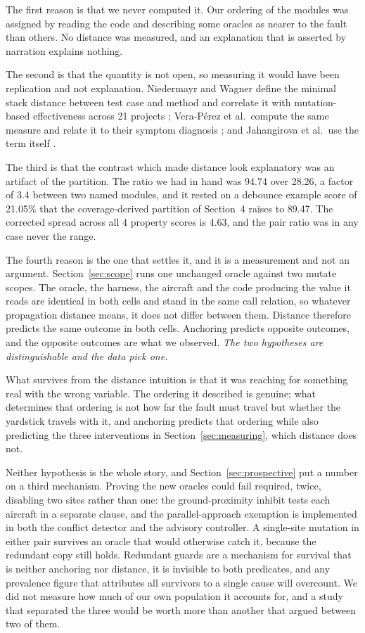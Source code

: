 \documentclass[12pt]{article}
\begin{document}
The first reason is that we never computed it. Our ordering of the modules was
assigned by reading the code and describing some oracles as nearer to the fault
than others. No distance was measured, and an explanation that is asserted by
narration explains nothing.

The second is that the quantity is not open, so measuring it would have been replication and not explanation. Niedermayr and Wagner define the minimal
stack distance between test case and method and correlate it with mutation-based
effectiveness across 21 projects \cite{niedermayr2019}; Vera-P\'erez et al.\ compute the same measure and relate it to their symptom diagnosis
\cite{veraperez2019}; and Jahangirova et al.\ use the term itself
\cite{jahangirova2016}.

The third is that the contrast which made distance look explanatory was an
artifact of the partition. The ratio we had in hand was 94.74 over 28.26, a
factor of 3.4 between two named modules, and it rested on a debounce example
score of 21.05\% that the coverage-derived partition of Section~4 raises to
89.47. The corrected spread across all 4 property scores is 4.63, and the pair
ratio was in any case never the range.

The fourth reason is the one that settles it, and it is a measurement and not an argument. Section~\ref{sec:scope} runs one unchanged oracle against two mutate
scopes. The oracle, the harness, the aircraft and the code producing the value it
reads are identical in both cells and stand in the same call relation, so whatever
propagation distance means, it does not differ between them. Distance therefore
predicts the same outcome in both cells. Anchoring predicts opposite outcomes,
and the opposite outcomes are what we observed. \emph{The two hypotheses are
distinguishable and the data pick one.}

What survives from the distance intuition is that it was reaching for something real
with the wrong variable. The ordering it described is genuine; what determines that
ordering is not how far the fault must travel but whether the yardstick travels with
it, and anchoring predicts that ordering while also predicting the three
interventions in Section~\ref{sec:measuring}, which distance does not.

Neither hypothesis is the whole story, and Section~\ref{sec:prospective} put a
number on a third mechanism. Proving the new oracles could fail required, twice,
disabling two sites rather than one: the ground-proximity inhibit tests each
aircraft in a separate clause, and the parallel-approach exemption is implemented
in both the conflict detector and the advisory controller. A single-site mutation
in either pair survives an oracle that would otherwise catch it, because the
redundant copy still holds. Redundant guards are a mechanism for survival that is
neither anchoring nor distance, it is invisible to both predicates, and any
prevalence figure that attributes all survivors to a single cause will overcount.
We did not measure how much of our own population it accounts for, and a study
that separated the three would be worth more than another that argued between
two of them.
\end{document}
